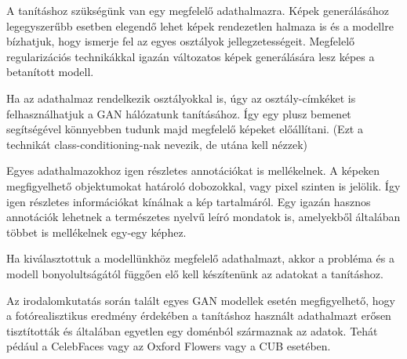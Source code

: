 \newpage


A tanításhoz szükségünk van egy megfelelő adathalmazra. Képek generálásához legegyszerűbb esetben elegendő lehet képek rendezetlen halmaza is és a modellre bízhatjuk, hogy ismerje fel az egyes osztályok jellegzetességeit. Megfelelő regularizációs technikákkal igazán változatos képek generálására lesz képes a betanított modell.

Ha az adathalmaz rendelkezik osztályokkal is, úgy az osztály-címkéket is felhasználhatjuk a GAN hálózatunk tanításához. Így egy plusz bemenet segítségével könnyebben tudunk majd megfelelő képeket előállítani. (Ezt a technikát class-conditioning-nak nevezik, de utána kell nézzek)

Egyes adathalmazokhoz igen részletes annotációkat is mellékelnek. A képeken megfigyelhető objektumokat határoló dobozokkal, vagy pixel szinten is jelölik. Így igen részletes információkat kínálnak a kép tartalmáról. Egy igazán hasznos annotációk lehetnek a természetes nyelvű leíró mondatok is, amelyekből általában többet is mellékelnek egy-egy képhez.

Ha kiválasztottuk a modellünkhöz megfelelő adathalmazt, akkor a probléma és a modell bonyolultságától függően elő kell készítenünk az adatokat a tanításhoz.

Az irodalomkutatás során talált egyes GAN modellek esetén megfigyelhető, hogy a fotórealisztikus eredmény érdekében a tanításhoz használt adathalmazt erősen tisztították és általában egyetlen egy doménból származnak az adatok. Tehát pédául a CelebFaces vagy az Oxford Flowers vagy a CUB esetében.

